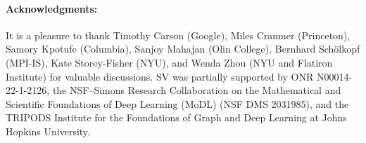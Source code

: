 \documentclass[twoside,11pt]{article}
\begin{document}
\paragraph{Acknowledgments:}
It is a pleasure to thank
  Timothy Carson (Google),
  Miles Cranmer (Princeton),
  Samory Kpotufe (Columbia),
  Sanjoy Mahajan (Olin College),
  Bernhard Sch\"olkopf (MPI-IS),
  Kate Storey-Fisher (NYU), and
  Wenda Zhou (NYU and Flatiron Institute)
for valuable discussions.
SV was partially supported by
ONR N00014-22-1-2126, the NSF–Simons Research Collaboration on the Mathematical and Scientific Foundations of Deep Learning
(MoDL) (NSF DMS 2031985), and the TRIPODS Institute for the Foundations of Graph and Deep Learning at Johns Hopkins University.


\end{document}
